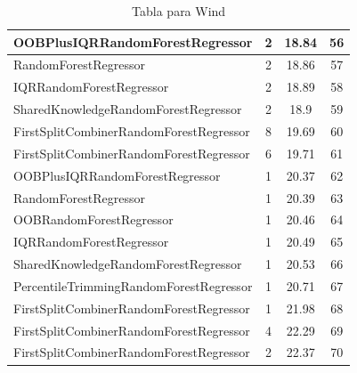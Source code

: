 \begin{table}[h]
\begin{tabular}{|l|c|c|c|}
\textcolor[HTML]{ede15b}{OOBPlusIQRRandomForestRegressor} & 2 & 18.84 & 56 \\ \hline
\textcolor[HTML]{87bc45}{RandomForestRegressor} & 2 & 18.86 & 57 \\ \hline
\textcolor[HTML]{27aeef}{IQRRandomForestRegressor} & 2 & 18.89 & 58 \\ \hline
\textcolor[HTML]{ef9b20}{SharedKnowledgeRandomForestRegressor} & 2 & 18.9 & 59 \\ \hline
\textcolor[HTML]{ea5545}{FirstSplitCombinerRandomForestRegressor} & 8 & 19.69 & 60 \\ \hline
\textcolor[HTML]{ea5545}{FirstSplitCombinerRandomForestRegressor} & 6 & 19.71 & 61 \\ \hline
\textcolor[HTML]{ede15b}{OOBPlusIQRRandomForestRegressor} & 1 & 20.37 & 62 \\ \hline
\textcolor[HTML]{87bc45}{RandomForestRegressor} & 1 & 20.39 & 63 \\ \hline
\textcolor[HTML]{b33dc6}{OOBRandomForestRegressor} & 1 & 20.46 & 64 \\ \hline
\textcolor[HTML]{27aeef}{IQRRandomForestRegressor} & 1 & 20.49 & 65 \\ \hline
\textcolor[HTML]{ef9b20}{SharedKnowledgeRandomForestRegressor} & 1 & 20.53 & 66 \\ \hline
\textcolor[HTML]{f46a9b}{PercentileTrimmingRandomForestRegressor} & 1 & 20.71 & 67 \\ \hline
\textcolor[HTML]{ea5545}{FirstSplitCombinerRandomForestRegressor} & 1 & 21.98 & 68 \\ \hline
\textcolor[HTML]{ea5545}{FirstSplitCombinerRandomForestRegressor} & 4 & 22.29 & 69 \\ \hline
\textcolor[HTML]{ea5545}{FirstSplitCombinerRandomForestRegressor} & 2 & 22.37 & 70 \\ \hline
\end{tabular}
\caption{Tabla para Wind}
\end{table}



